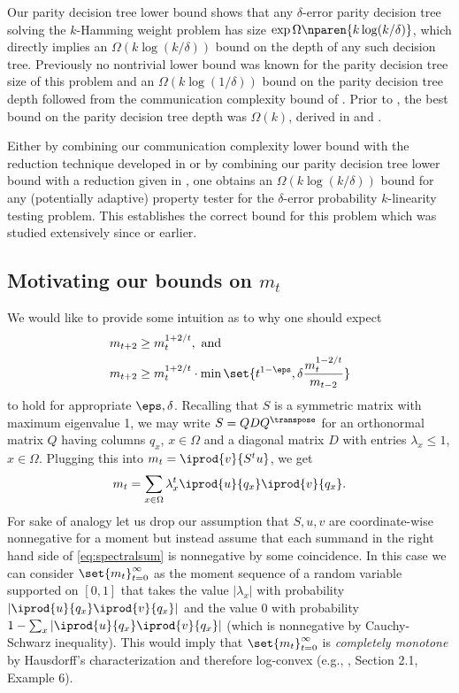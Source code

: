 Our parity decision tree lower bound shows that any 
$\delta$-error parity decision tree solving the 
$k$-Hamming weight problem has size 
$\exp\Omega\nparen{k\log (k/\delta)}$, 
which directly implies an $\Omega(k\log (k/\delta))$ 
bound on the depth of any such decision tree. 
Previously no nontrivial lower bound was known for 
the parity decision tree size of this problem and 
an $\Omega(k\log (1/\delta))$ bound on the parity 
decision tree depth followed from the communication 
complexity bound of \cite{BlaisBG2014}. Prior to 
\cite{BlaisBG2014}, the best bound on the parity 
decision tree depth was $\Omega(k)$, derived in 
\cite{BlaisBM2012} and \cite{BlaisK2012}.

Either by combining our communication complexity lower 
bound with the reduction technique developed in 
\cite{BlaisBM2012} or by combining our parity decision 
tree lower bound with a reduction given in 
\cite{BhrushundiCK2014}, one obtains an 
$\Omega(k\log (k/\delta))$ bound for any (potentially adaptive) 
property tester for the $\delta$-error probability 
$k$-linearity testing problem. This establishes the 
correct bound for this problem which was studied extensively 
\cite{FischerLNRRS2002, Goldreich2010, BlaisK2012, 
BhrushundiCK2014,BuhrmanGMW2012, BlaisBM2012}
since \cite{FischerLNRRS2002} or earlier.


\subsection{Motivating our bounds on $m_t$}
We would like to provide some intuition as to why one should expect
\begin{align}
m_{t+2}    &\ge m_t^{1+2/t}, \text{ and}\label{eq:bd66}\\
m_{t+2}    &\ge m_t^{1+2/t}\cdot \min\set{t^{1-\eps}, 
            \delta\frac{m_t^{1-2/t}}{m_{t-2}}}
\end{align}
to hold for appropriate $\eps,\delta$.
Recalling that $S$ is a symmetric matrix with maximum 
eigenvalue 1, we may write $S=QDQ^\transpose$
for an orthonormal matrix $Q$ having columns $q_x$, $x\in\Omega$
and a diagonal matrix $D$ with entries $\lambda_x \le 1$, 
$x\in \Omega$. Plugging this into 
$m_t=\iprod{v}{S^tu}$, we get
\begin{align}
\label{eq:spectralsum}
m_t = \sum_{x\in\Omega}\lambda_x^t\iprod{u}{q_x}\iprod{v}{q_x}.
\end{align}
For sake of analogy let us drop our assumption that $S, u, v$
are coordinate-wise nonnegative for a moment but instead assume
that each summand in the right hand side of
\autoref{eq:spectralsum}
is nonnegative by some coincidence. In this case we can
consider $\set{m_t}_{t=0}^\infty$ as the moment sequence of a 
random variable supported on $[0,1]$ that takes the
value $|\lambda_x|$ with probability 
$|\iprod{u}{q_x}\iprod{v}{q_x}|$ and the value 0 with
probability
$1-\sum_x|\iprod{u}{q_x}\iprod{v}{q_x}|$ (which is nonnegative
by Cauchy-Schwarz inequality). 
This would imply that $\set{m_t}_{t=0}^\infty$ is 
{\em completely monotone} by Hausdorff's characterization 
\cite{Hausdorff1921} and therefore log-convex 
(e.g., \cite{NiculescuP2005}, Section 2.1, Example 6).

